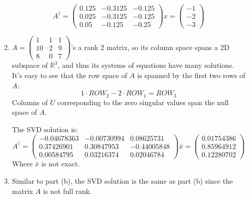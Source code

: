 \documentclass[conference,onecolumn]{IEEEtran}
\begin{document}
\begin{enumerate}[label=\arabic{enumi}.]
\begin{enumerate}
                    $$
                        A^{\dagger} =
                        \begin{pmatrix}
                            0.125 & -0.3125 & -0.125 \\
                            0.025 & -0.3125 & -0.125 \\
                            0.05  & -0.125  & -0.25
                        \end{pmatrix}
                        x =
                        \begin{pmatrix}
                            -1 \\
                            -2 \\
                            -3
                        \end{pmatrix}
                    $$
              \item $A =
                        \begin{pmatrix}
                            1  & 1 & 1 \\
                            10 & 2 & 9 \\
                            8  & 0 & 7
                        \end{pmatrix}$'s a rank 2 matrix, so its column space spans a 2D subspace of $\mathbb{R}^3$, and thus its systems of equations have many solutions.
                    It's easy to see that the row space of $A$ is spanned by the first two rows of $A$:
                    $$
                        1 \cdot ROW_2 - 2 \cdot ROW_1 = ROW_3
                    $$
                    Columns of $U$ corresponding to the zero singular values span the null space of $A$.

                    The SVD solution is:
                    $$
                        A^{\dagger} =
                        \begin{pmatrix}
                            -0.04678363 & -0.00730994 & 0.08625731  \\
                            0.37426901  & 0.30847953  & -0.44005848 \\
                            0.00584795  & 0.03216374  & 0.02046784
                        \end{pmatrix}
                        \bar{x} =
                        \begin{pmatrix}
                            0.01754386 \\
                            0.85964912 \\
                            0.12280702
                        \end{pmatrix}
                    $$
                    Where $\bar{x}$ is not exact.
              \item Similar to part (b), the SVD solution is the same as part (b) since the matrix $A$ is not full rank.


\end{enumerate}
\end{enumerate}
\end{document}
